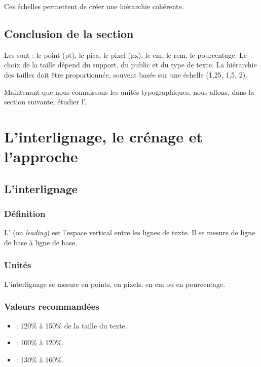 Ces échelles permettent de créer une hiérarchie cohérente.

\subsection*{Conclusion de la section}

\begin{retenir}
Les  sont : le point (pt), le pica, le pixel (px), le em, le rem, le pourcentage. Le choix de la taille dépend du support, du public et du type de texte. La hiérarchie des tailles doit être proportionnée, souvent basée sur une échelle (1,25, 1,5, 2).
\end{retenir}

Maintenant que nous connaissons les unités typographiques, nous allons, dans la section suivante, étudier l'.

\section{L'interlignage, le crénage et l'approche}

\subsection{L'interlignage}

\subsubsection{Définition}

L' (ou \emph{leading}) est l'espace vertical entre les lignes de texte. Il se mesure de ligne de base à ligne de base.

\subsubsection{Unités}

L'interlignage se mesure en points, en pixels, en em ou en pourcentage.

\subsubsection{Valeurs recommandées}

\begin{itemize}
    \item {} : 120\% à 150\% de la taille du texte.
    \item {} : 100\% à 120\%.
    \item {} : 130\% à 160\%.
\end{itemize}

